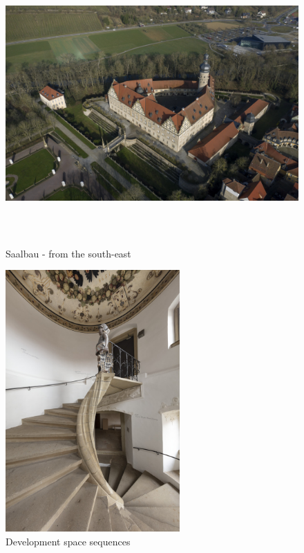 \documentclass[
  a4paper,
]{book}
\begin{document}
\begin{figure}
\includegraphics[height=10cm]{images/fmd10024322a.jpg}

\caption{Saalbau - from the south-east}
\label{fig:{images/fmd10024322a.jpg}}

\clearpage

\centering

\includegraphics[height=10cm]{images/fmd10005853a.jpg}

\caption{Development space sequences}
\label{fig:{images/fmd10005853a.jpg}}

\clearpage

\centering


\end{figure}
\end{document}
